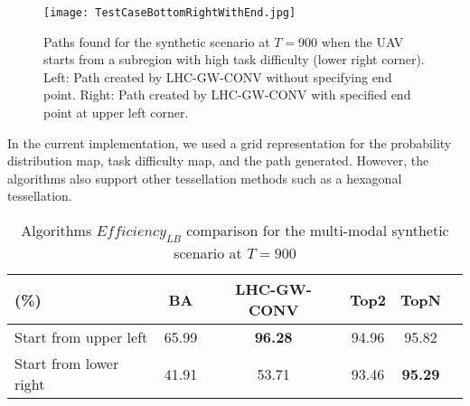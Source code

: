 \begin{figure}
\centering
\texttt{[image: TestCaseBottomRightWithEnd.jpg]}
\caption{Paths found for the synthetic scenario at $T=900$ when the UAV starts from a subregion with high task difficulty (lower right corner). Left: Path created by LHC-GW-CONV without specifying end point. Right: Path created by LHC-GW-CONV with specified end point at upper left corner.}
\label{SyntheticCasePaths3}
\end{figure}


In the current implementation, we used a grid representation for the probability distribution map, task difficulty map, and the path generated. However, the algorithms also support other tessellation methods such as a hexagonal tessellation.
\begin{table}[!ht]
\caption{Algorithms $\mathit{Efficiency_{LB}}$ comparison for the multi-modal synthetic scenario at $T=900$}
	\centering
		\begin{tabular}
			{|l|c|c|c|c|c|}
			\hline
			(\%) & BA & LHC-GW-CONV & Top2 & TopN \\
			\hline
			Start from upper left & 65.99 & \textbf{96.28} & 94.96 & 95.82 \\
			\hline			
			Start from lower right & 41.91 & 53.71 & 93.46 & \textbf{95.29} \\			\hline			
		\end{tabular}
\label{Synthetic}
\end{table}

